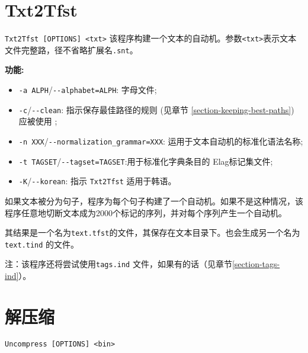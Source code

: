 \bigskip

\section{Txt2Tfst} \verb+Txt2Tfst [OPTIONS] <txt>+
\bigskip
\noindent 该程序构建一个文本的自动机。参数\verb+<txt>+表示文本文件完整路，径不省略扩展名\verb+.snt+。


\bigskip
\noindent \textbf{功能:}
\begin{itemize}
  \item \verb+-a ALPH+/\verb+--alphabet=ALPH+: 字母文件;
  
  \item \verb+-c+/\verb+--clean+: 指示保存最佳路径的规则 (见章节 \ref{section-keeping-best-paths}) 应被使用 ;
  
  \item \verb+-n XXX+/\verb+--normalization_grammar=XXX+: 运用于文本自动机的标准化语法名称; 
  \item \verb+-t TAGSET+/\verb+--tagset=TAGSET+:用于标准化字典条目的
  Elag标记集文件;
  \item \verb+-K+/\verb+--korean+: 指示 \verb+Txt2Tfst+ 适用于韩语。

\end{itemize}

\bigskip
\noindent 如果文本被分为句子，程序为每个句子构建了一个自动机。如果不是这种情况，该程序任意地切断文本成为2000个标记的序列，并对每个序列产生一个自动机。

\bigskip
\noindent 其结果是一个名为\verb+text.tfst+的文件，其保存在文本目录下。也会生成另一个名为\verb+text.tind+ 的文件。

\bigskip
\noindent 注：该程序还将尝试使用\verb+tags.ind+ 文件，如果有的话（见章节\ref{section-tags-ind}）。







\section{解压缩}
\label{section-Uncompress}
\verb+Uncompress [OPTIONS] <bin>+

